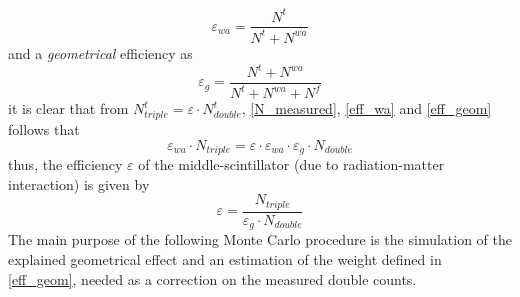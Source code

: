 \begin{equation}\label{eff_wa}
\varepsilon_{wa} = \frac{N^t}{N^t+N^{wa}}
\end{equation}
and a \emph{geometrical} efficiency as
\begin{equation}\label{eff_geom}
\varepsilon_{g} = \frac{N^t+N^{wa}}{N^t+N^{wa}+N^f}
\end{equation}
it is clear that from $N_{triple}^t=\varepsilon\cdot N_{double}^t$, \eqref{N_measured}, \eqref{eff_wa} and \eqref{eff_geom} follows that
\begin{equation}
\varepsilon_{wa}\cdot N_{triple} = \varepsilon\cdot\varepsilon_{wa}\cdot\varepsilon_g\cdot N_{double}
\end{equation}
thus, the efficiency $\varepsilon$ of the middle-scintillator (due to radiation-matter interaction) is given by
\begin{equation}\label{eq:eff_correct}
\varepsilon = \frac{N_{triple}}{\varepsilon_g\cdot N_{double}}
\end{equation}
The main purpose of the following Monte Carlo procedure is the simulation of the explained geometrical effect and an estimation of the weight defined in \eqref{eff_geom}, needed as a correction on the measured double counts.

